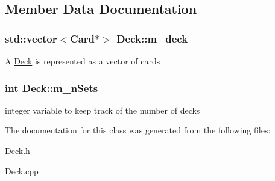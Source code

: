 \subsection{Member Data Documentation}
\subsubsection[{\texorpdfstring{m\+\_\+deck}{m_deck}}]{\setlength{\rightskip}{0pt plus 5cm}std\+::vector$<${\bf Card}$\ast$$>$ Deck\+::m\+\_\+deck}\hypertarget{class_deck_ac27728877c50e97028566f9cb774408b}{}\label{class_deck_ac27728877c50e97028566f9cb774408b}
A \hyperlink{class_deck}{Deck} is represented as a vector of cards 
\subsubsection[{\texorpdfstring{m\+\_\+n\+Sets}{m_nSets}}]{\setlength{\rightskip}{0pt plus 5cm}int Deck\+::m\+\_\+n\+Sets}\hypertarget{class_deck_af52c03d790a3182c7325d528839cd640}{}\label{class_deck_af52c03d790a3182c7325d528839cd640}
integer variable to keep track of the number of decks 

The documentation for this class was generated from the following files\+:\begin{DoxyCompactItemize}
\item 
Deck.\+h\item 
Deck.\+cpp\end{DoxyCompactItemize}
